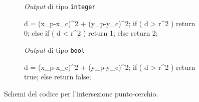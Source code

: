 \begin{figure}[h]
\hfill
	\begin{subfigure}[t]{.475\linewidth}
	\raggedright
	\textit{Output} di tipo \texttt{integer}\\
	\vspace{.5em}
	\begin{pseudoc}
	d = (x_p-x_c)^2 + (y_p-y_c)^2;
	if ( d > r^2 ){ return  0; }
	else if ( d < r^2 ){ return 1; }
	else { return 2; }
	\end{pseudoc}
	\end{subfigure}
\hfill
	\begin{subfigure}[t]{.475\textwidth}
	\raggedright
	\textit{Output} di tipo \texttt{bool}\\
	\vspace{1em}
	\begin{pseudoc}
	d = (x_p-x_c)^2 + (y_p-y_c)^2;
	if ( d > r^2 ){ return  true; }
	else { return false; }
	\end{pseudoc}	
	\end{subfigure}
\hfill
\caption{Schemi del codice per l'intersezione punto-cerchio.}
\label{Pointcircle}
\end{figure}
%
